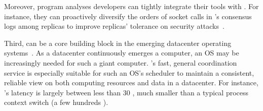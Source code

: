 Moreover, program analyses developers can tightly integrate their tools with 
\xxx. For instance, they can proactively diversify the orders of socket calls 
in \xxx's consensus logs among replicas to improve replicas' tolerance on 
security attacks~\cite{con:hotpar12}.

% 


Third, \xxx can be a core building block in the emerging datacenter operating 
systems~\cite{matei:hotcloud11, mesos:nsdi11, datacenter:os}. As a 
datacenter continuously emerges a computer, an OS may be increasingly needed for 
such a giant computer. \xxx's fast, general coordination service is especially 
suitable for such an OS's scheduler to maintain a consistent, reliable view on 
both computing resources and data in a datacenter. For instance, \xxx's 
latency is largely between less than 30 \us, much smaller than a typical 
process context switch (a few hundreds \us).
